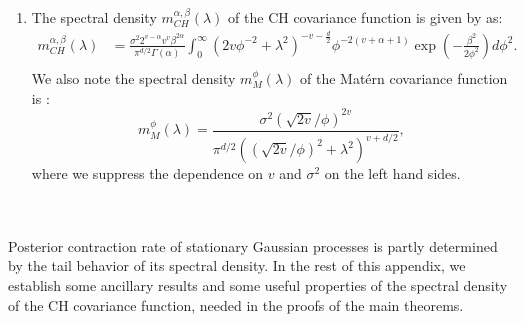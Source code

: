 \documentclass[ejs,noshowframe]{imsart}
\theoremstyle{plain}
\theoremstyle{definition}
\theoremstyle{remark}
\begin{document}
\begin{appendix}
\begin{enumerate}
\item The spectral density $m^{\alpha,\beta}_{CH}(\lambda)$ of the CH covariance function is given by \citet{ma2022beyond} as:
\begin{displaymath}
\begin{split}
m^{\alpha,\beta}_{CH}(\lambda) &=  \frac{\sigma^2 2^{v-\alpha} v^v \beta^{2\alpha}}{\pi^{d/2}\Gamma(\alpha)}\int_0^{\infty} (2v\phi^{-2}+\lambda^2)^{-v-\frac{d}{2}}  \phi^{-2(v+\alpha+1)} \exp{(-\frac{\beta^2}{2\phi^2})d\phi^2}. \\
\end{split}
\end{displaymath}
We also note the spectral density $m^{\phi}_M(\lambda)$ of the Mat\'ern covariance function is \citep{stein1999interpolation}:
$$
m^{\phi}_M(\lambda) =\frac{\sigma^2(\sqrt{2 v} / \phi)^{2 v}}{\pi^{d / 2}\left((\sqrt{2 v} / \phi)^2+\lambda^2\right)^{v+d/2}},
$$
where we suppress the dependence on $v$ and $\sigma^2$ on the left hand sides.
\end{enumerate}
\noindent
\\
\\
Posterior contraction rate of stationary Gaussian processes is partly determined by the tail behavior of its spectral density. In the rest of this appendix, we establish some ancillary results and some useful properties of  the spectral density of the CH covariance function, needed in the proofs of the main theorems.


\end{appendix}
\end{document}
